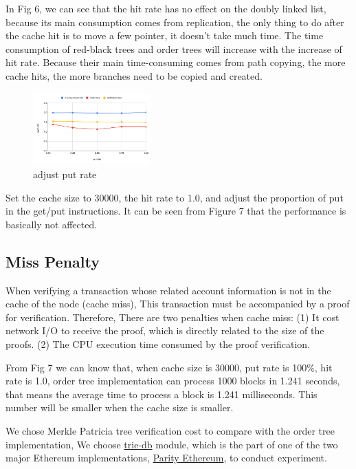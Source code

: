 \documentclass[conference]{IEEEtran}
\begin{document}
In Fig 6, we can see that the hit rate has no effect
on the doubly linked list, because its main consumption
comes from replication, the only thing to do
after the cache hit is to move a few pointer,
it doesn't take much time.
The time consumption of red-black trees and order
trees will increase with the increase of hit rate.
Because their main time-consuming comes from path copying,
the more cache hits, the more branches need
to be copied and created.

\begin{figure}
  \centering
  \includegraphics[width=0.4\textwidth]{adjust_put_rate.png}
  \caption{adjust put rate}
\end{figure}

Set the cache size to 30000, the hit rate to 1.0,
and adjust the proportion of put in the get/put instructions.
It can be seen from Figure 7 that the performance
is basically not affected.

\subsection{Miss Penalty}

When verifying a transaction whose related account information
is not in the cache of the node (cache miss),
This transaction must be accompanied by a proof
for verification. Therefore, There are two penalties when cache miss:
(1) It cost network I/O to receive the proof, which is directly related
to the size of the proofs.
(2) The CPU execution time consumed by the proof verification.

From Fig 7 we can know that, when cache size is 30000,
put rate is 100\%, hit rate is 1.0, order tree implementation
can process 1000 blocks in 1.241 seconds, that means 
the average time to process a block is 1.241 milliseconds.
This number will be smaller when the cache size is smaller.

We chose Merkle Patricia tree verification cost to compare
with the order tree implementation,
We choose \href{https://docs.rs/trie-db/0.20.1/trie_db/index.html}{trie-db} module,
which is the part of one of the two major
Ethereum implementations,
\href{https://www.parity.io/ethereum/}{Parity Ethereum}, to conduct experiment.
\end{document}
